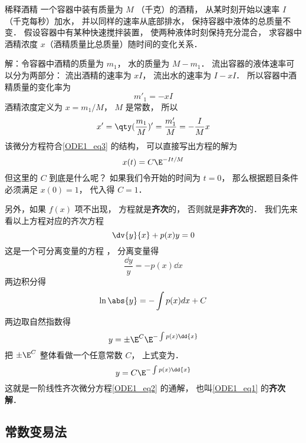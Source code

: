\begin{example}{稀释酒精}
一个容器中装有质量为 $M$ （千克）的酒精， 从某时刻开始以速率 $I$ （千克每秒）加水， 并以同样的速率从底部排水， 保持容器中液体的总质量不变． 假设容器中有某种快速搅拌装置， 使两种液体时刻保持充分混合， 求容器中酒精浓度 $x$（酒精质量比总质量）随时间的变化关系．

解：令容器中酒精的质量为 $m_1$， 水的质量为 $M - m_1$． 流出容器的液体速率可以分为两部分： 流出酒精的速率为 $xI$， 流出水的速率为 $I - xI$． 所以容器中酒精质量的变化率为
\begin{equation}
m'_1 = -xI
\end{equation}
酒精浓度定义为 $x = m_1/M$， $M$ 是常数， 所以
\begin{equation}
x' = \qty(\frac{m_1}{M})' = \frac{m'_1}{M} = -\frac{I}{M}x
\end{equation}
该微分方程符合\autoref{ODE1_eq3} 的结构， 可以直接写出方程的解为
\begin{equation}
x(t) = C\E^{-It/M}
\end{equation}
但这里的 $C$ 到底是什么呢？ 如果我们令开始的时间为 $t = 0$， 那么根据题目条件必须满足 $x(0) = 1$， 代入得 $C = 1$．
\end{example}


 另外，如果 $f(x)$ 项不出现， 方程就是\textbf{齐次}的， 否则就是\textbf{非齐次}的． 我们先来看以上方程对应的齐次方程
\begin{equation}\label{ODE1_eq2}
\dv{y}{x} + p(x)y = 0
\end{equation}
这是一个可分离变量的方程%
， 分离变量得
\begin{equation}
\frac{\dd{y}}{y} = -p(x) \dd{x}
\end{equation}
两边积分得
\begin{equation}
\ln\abs{y} = -\int p(x) dx + C
\end{equation}
两边取自然指数得
\begin{equation}
y = \pm \E^C \E^{-\int p(x) \dd{x}}
\end{equation}
把 $\pm \E^C $ 整体看做一个任意常数 $C$， 上式变为．
\begin{equation}\label{ODE1_eq6}
y = C \E^{-\int p(x) \dd{x}}
\end{equation}
这就是一阶线性齐次微分方程\autoref{ODE1_eq2} 的通解， 也叫\autoref{ODE1_eq1} 的\textbf{齐次解}．

\subsection{常数变易法}

